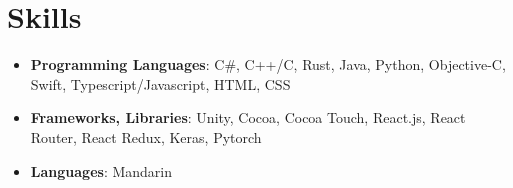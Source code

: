 \documentclass[10pt, letterpaper]{article}
\begin{document}
  \section{Skills}
  \begin{itemize}
    \item \textbf{Programming Languages}: C\#, C++/C, Rust, Java,
    Python, Objective-C, Swift, Typescript/Javascript, HTML, CSS
    \item \textbf{Frameworks, Libraries}: Unity, Cocoa, Cocoa Touch,
    React.js, React Router, React Redux, Keras, Pytorch
    \item \textbf{Languages}: Mandarin
  \end{itemize}
\end{document}
